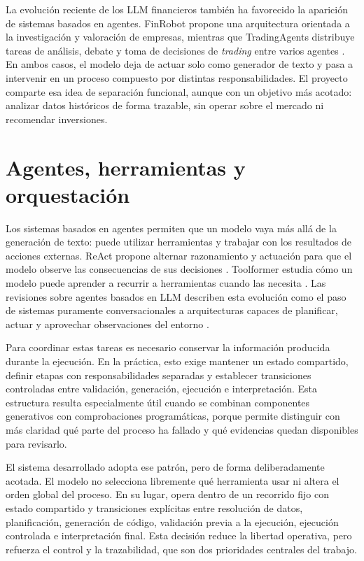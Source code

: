 La evoluci\'on reciente de los LLM financieros tambi\'en ha favorecido la aparici\'on de sistemas basados en agentes. FinRobot propone una arquitectura orientada a la 
investigaci\'on y valoraci\'on de empresas, mientras que TradingAgents distribuye tareas de an\'alisis, debate y toma de decisiones de \textit{trading} entre varios 
agentes \cite{zhou2024finrobot,xiao2024tradingagents}. En ambos casos, el modelo deja de actuar solo como generador de texto y pasa a intervenir en un proceso compuesto 
por distintas responsabilidades. El proyecto comparte esa idea de separaci\'on funcional, aunque con un objetivo m\'as acotado: analizar datos hist\'oricos de forma 
trazable, sin operar sobre el mercado ni recomendar inversiones.

\section{Agentes, herramientas y orquestaci\'on}

Los sistemas basados en agentes permiten que un modelo vaya m\'as all\'a de la generaci\'on de texto: puede utilizar herramientas y trabajar con los resultados de 
acciones externas. ReAct propone alternar razonamiento y actuaci\'on para que el modelo observe las consecuencias de sus decisiones \cite{yao2022react}. Toolformer 
estudia c\'omo un modelo puede aprender a recurrir a herramientas cuando las necesita \cite{schick2023toolformer}. Las revisiones sobre agentes basados en LLM describen 
esta evoluci\'on como el paso de sistemas puramente conversacionales a arquitecturas capaces de planificar, actuar y aprovechar observaciones del entorno \cite{wang2023agentsurvey}.

Para coordinar estas tareas es necesario conservar la informaci\'on producida durante la ejecuci\'on. En la pr\'actica, esto exige mantener un estado compartido, definir 
etapas con responsabilidades separadas y establecer transiciones controladas entre validaci\'on, generaci\'on, ejecuci\'on e interpretaci\'on. Esta estructura resulta 
especialmente \'util cuando se combinan componentes generativos con comprobaciones program\'aticas, porque permite distinguir con m\'as claridad qu\'e parte del proceso 
ha fallado y qu\'e evidencias quedan disponibles para revisarlo.

El sistema desarrollado adopta ese patr\'on, pero de forma deliberadamente acotada. El modelo no selecciona libremente qu\'e herramienta usar ni altera el orden global 
del proceso. En su lugar, opera dentro de un recorrido fijo con estado compartido y transiciones expl\'icitas entre resoluci\'on de datos, planificaci\'on, generaci\'on 
de c\'odigo, validaci\'on previa a la ejecuci\'on, ejecuci\'on controlada e interpretaci\'on final. Esta decisi\'on reduce la libertad operativa, pero refuerza el 
control y la trazabilidad, que son dos prioridades centrales del trabajo.

